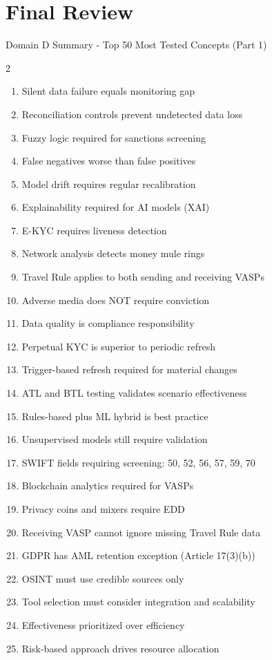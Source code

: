 \documentclass[11pt,a4paper]{beamer}
\begin{document}
	\section{Final Review}
	
	\begin{frame}{Domain D Summary - Top 50 Most Tested Concepts (Part 1)}
		\begin{multicols}{2}
			\begin{enumerate}
				\item Silent data failure equals monitoring gap
				\item Reconciliation controls prevent undetected data loss
				\item Fuzzy logic required for sanctions screening
				\item False negatives worse than false positives
				\item Model drift requires regular recalibration
				\item Explainability required for AI models (XAI)
				\item E-KYC requires liveness detection
				\item Network analysis detects money mule rings
				\item Travel Rule applies to both sending and receiving VASPs
				\item Adverse media does NOT require conviction
				\item Data quality is compliance responsibility
				\item Perpetual KYC is superior to periodic refresh
				\item Trigger-based refresh required for material changes
				\item ATL and BTL testing validates scenario effectiveness
				\item Rules-based plus ML hybrid is best practice
				\item Unsupervised models still require validation
				\item SWIFT fields requiring screening: 50, 52, 56, 57, 59, 70
				\item Blockchain analytics required for VASPs
				\item Privacy coins and mixers require EDD
				\item Receiving VASP cannot ignore missing Travel Rule data
				\item GDPR has AML retention exception (Article 17(3)(b))
				\item OSINT must use credible sources only
				\item Tool selection must consider integration and scalability
				\item Effectiveness prioritized over efficiency
				\item Risk-based approach drives resource allocation
			\end{enumerate}
		\end{multicols}
	\end{frame}
	
\end{document}
